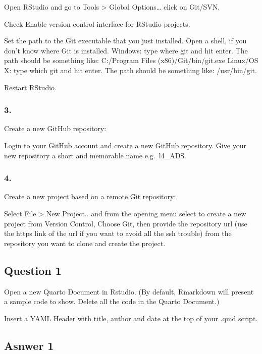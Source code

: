 \documentclass[
  letterpaper,
  DIV=11,
  numbers=noendperiod]{scrartcl}
\begin{document}
Open RStudio and go to Tools \textgreater{} Global Options\ldots{} click
on Git/SVN.

Check Enable version control interface for RStudio projects.

Set the path to the Git executable that you just installed. Open a
shell, if you don't know where Git is installed. Windows: type where git
and hit enter. The path should be something like: C:/Program Files
(x86)/Git/bin/git.exe Linux/OS X: type which git and hit enter. The path
should be something like: /usr/bin/git.

Restart RStudio.

\hypertarget{section-2}{%
\subsubsection{3.}\label{section-2}}

Create a new GitHub repository:

Login to your GitHub account and create a new GitHub repository. Give
your new repository a short and memorable name e.g.~l4\_ADS.

\hypertarget{section-3}{%
\subsubsection{4.}\label{section-3}}

Create a new project based on a remote Git repository:

Select File \textgreater{} New Project.. and from the opening menu
select to create a new project from Version Control, Choose Git, then
provide the repository url (use the https link of the url if you want to
avoid all the ssh trouble) from the repository you want to clone and
create the project.

\hypertarget{question-1}{%
\subsection{Question 1}\label{question-1}}

Open a new Quarto Document in Rstudio. (By default, Rmarkdown will
present a sample code to show. Delete all the code in the Quarto
Document.)

Insert a YAML Header with title, author and date at the top of your .qmd
script.

\hypertarget{asnwer-1}{%
\subsection{Asnwer 1}\label{asnwer-1}}
\end{document}
